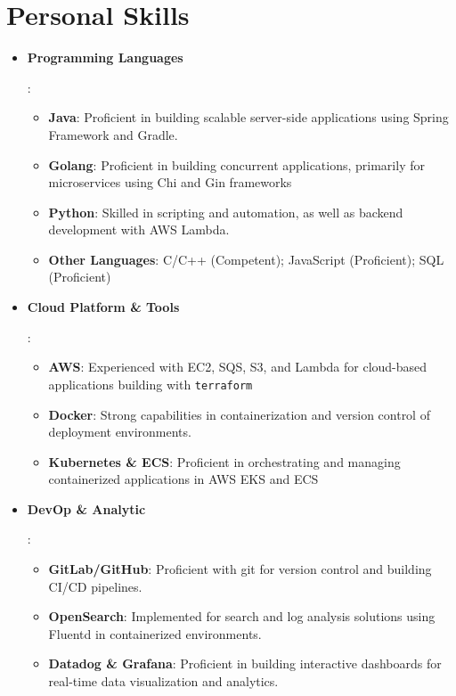 \documentclass[letterpaper,11pt]{article}
\newcommand{\resumeItem}[2]{
  \item\small{
    \textbf{#1}{: #2 \vspace{-2pt}}
  }
}
\newcommand{\resumeSubItem}[2]{
  \item\small{
    \textbf{#1}{: #2 \vspace{-2pt}}
  }
}
\newcommand{\resumeItemListStart}{\begin{itemize}[leftmargin=*]}
\newcommand{\resumeItemListEnd}{\end{itemize}\vspace{-5pt}}
\newcommand{\resumeSubItemListStart}{\begin{itemize}\vspace{-5pt}}
\newcommand{\resumeSubItemListEnd}{\end{itemize}\vspace{-5pt}}
\begin{document}
\section{Personal Skills}
    \resumeItemListStart
        \resumeItem{Programming Languages}{
          \resumeSubItemListStart
            \resumeSubItem{Java}{Proficient in building scalable server-side applications using Spring Framework and Gradle.}
            \resumeSubItem{Golang}{Proficient in building concurrent applications, primarily for microservices using Chi and Gin frameworks}
            \resumeSubItem{Python}{Skilled in scripting and automation, as well as backend development with AWS Lambda.}
            \resumeSubItem{Other Languages}{C/C++ (Competent); JavaScript (Proficient); SQL (Proficient)}
          \resumeSubItemListEnd
        }
        \resumeItem{Cloud Platform \& Tools}{
          \resumeSubItemListStart
            \resumeSubItem{AWS}{Experienced with EC2, SQS, S3, and Lambda for cloud-based applications building with \texttt{terraform}}
            \resumeSubItem{Docker}{Strong capabilities in containerization and version control of deployment environments.}
            \resumeSubItem{Kubernetes \& ECS}{Proficient in orchestrating and managing containerized applications in AWS EKS and ECS}
          \resumeSubItemListEnd
        }
        \resumeItem{DevOp \& Analytic}{
          \resumeSubItemListStart
            \resumeSubItem{GitLab/GitHub}{Proficient with git for version control and building CI/CD pipelines.}
            \resumeSubItem{OpenSearch}{Implemented for search and log analysis solutions using Fluentd in containerized environments.}
            \resumeSubItem{Datadog \& Grafana}{Proficient in building interactive dashboards for real-time data visualization and analytics.}
          \resumeSubItemListEnd
        }
    \resumeItemListEnd

\end{document}

